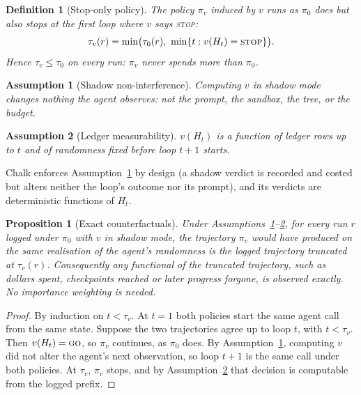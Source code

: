 \documentclass[11pt]{article}
\newtheorem{definition}{Definition}
\newtheorem{assumption}{Assumption}
\newtheorem{proposition}{Proposition}
\theoremstyle{remark}
\begin{document}
\begin{definition}[Stop-only policy]
The policy $\pi_v$ induced by $v$ runs as $\pi_0$ does but also stops at the first loop where $v$ says \textup{\textsc{stop}}:
\[
\tau_v(r)=\min\bigl(\tau_0(r),\ \min\{t: v(H_t)=\textup{\textsc{stop}}\}\bigr).
\]
Hence $\tau_v\le\tau_0$ on every run: $\pi_v$ never spends more than $\pi_0$.
\end{definition}

\begin{assumption}[Shadow non-interference]
\label{as:shadow}
Computing $v$ in shadow mode changes nothing the agent observes: not the prompt, the sandbox, the tree, or the budget.
\end{assumption}

\begin{assumption}[Ledger measurability]
\label{as:measurable}
$v(H_t)$ is a function of ledger rows up to $t$ and of randomness fixed before loop $t{+}1$ starts.
\end{assumption}

Chalk enforces Assumption~\ref{as:shadow} by design (a shadow verdict is recorded and costed but alters neither the loop's outcome nor its prompt), and its verdicts are deterministic functions of $H_t$.

\begin{proposition}[Exact counterfactuals]
\label{prop:exact}
Under Assumptions~\ref{as:shadow}--\ref{as:measurable}, for every run $r$ logged under $\pi_0$ with $v$ in shadow mode, the trajectory $\pi_v$ would have produced on the same realisation of the agent's randomness is the logged trajectory truncated at $\tau_v(r)$. Consequently any functional of the truncated trajectory, such as dollars spent, checkpoints reached or later progress forgone, is observed exactly. No importance weighting is needed.
\end{proposition}

\begin{proof}
By induction on $t<\tau_v$. At $t=1$ both policies start the same agent call from the same state. Suppose the two trajectories agree up to loop $t$, with $t<\tau_v$. Then $v(H_t)=\textup{\textsc{go}}$, so $\pi_v$ continues, as $\pi_0$ does. By Assumption~\ref{as:shadow}, computing $v$ did not alter the agent's next observation, so loop $t{+}1$ is the same call under both policies. At $\tau_v$, $\pi_v$ stops, and by Assumption~\ref{as:measurable} that decision is computable from the logged prefix.
\end{proof}
\end{document}
